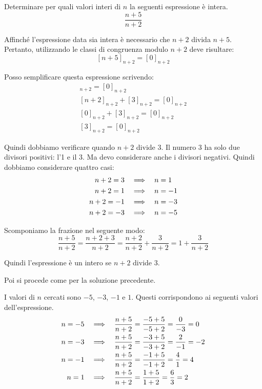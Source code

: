 \begin{esercizio}
    Determinare per quali valori interi di $n$ la seguenti espressione è intera.
    \[
        \dfrac{n+5}{n+2}
    \]


    Affinché l'espressione data sia intera è necessario che $n+2$ divida $n+5$.
    Pertanto, utilizzando le classi di congruenza modulo $n+2$ deve risultare:
    \[
        [n+5]_{n+2} = [0]_{n+2}
    \]

    Posso semplificare questa espressione scrivendo:
    \begin{gather*}
        [n+2+3]_{n+2} = [0]_{n+2} \\
        [n+2]_{n+2}+[3]_{n+2} = [0]_{n+2} \\
        [0]_{n+2}+[3]_{n+2} = [0]_{n+2} \\
        [3]_{n+2} = [0]_{n+2}
    \end{gather*}

    Quindi dobbiamo verificare quando $n+2$ divide 3.
    Il numero 3 ha solo due divisori positivi: l'1 e il 3.
    Ma devo considerare anche i divisori negativi.
    Quindi dobbiamo considerare quattro casi:
    \begin{align*}
        n+2 = 3 & \quad\Longrightarrow\quad  n = 1 \\
        n+2 = 1 & \quad\Longrightarrow\quad  n = -1 \\
        n+2 = -1 & \quad\Longrightarrow\quad  n = -3 \\
        n+2 = -3 & \quad\Longrightarrow\quad  n = -5
    \end{align*}


    Scomponiamo la frazione nel seguente modo:
    \begin{equation*}
        \dfrac{n+5}{n+2} = \dfrac{n+2 + 3}{n+2} = \dfrac{n+2}{n+2} + \dfrac{3}{n+2} = 1 + \dfrac{3}{n+2}
    \end{equation*}

    Quindi l'espressione è un intero se $n+2$ divide 3.

    Poi si procede come per la soluzione precedente.


    I valori di $n$ cercati sono $-5$, $-3$, $-1$ e $1$.
    Questi corrispondono ai seguenti valori dell'espressione.
    \begin{align*}
        n = -5 & \quad\Longrightarrow\quad  \dfrac{n+5}{n+2} = \dfrac{-5+5}{-5+2} = \dfrac{0}{-3} = 0 \\
        n = -3 & \quad\Longrightarrow\quad  \dfrac{n+5}{n+2} = \dfrac{-3+5}{-3+2} = \dfrac{2}{-1} = -2 \\
        n = -1 & \quad\Longrightarrow\quad  \dfrac{n+5}{n+2} = \dfrac{-1+5}{-1+2} = \dfrac{4}{1} = 4 \\
        n = 1 & \quad\Longrightarrow\quad  \dfrac{n+5}{n+2} = \dfrac{1+5}{1+2} = \dfrac{6}{3} = 2 \\
    \end{align*}

\end{esercizio}

